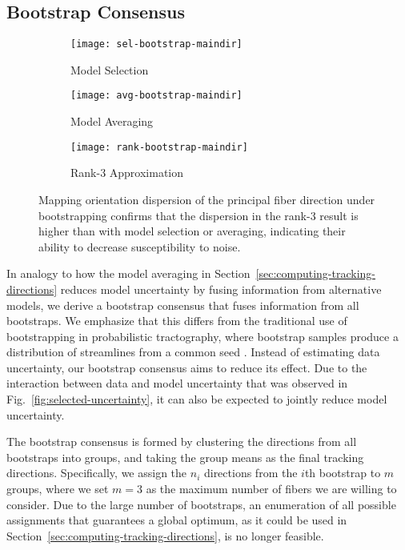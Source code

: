 \subsection{Bootstrap Consensus}
\label{sec:bootstrap-consensus}
\begin{figure*}[t]
	\centering
	\begin{subfigure}[b]{0.32\linewidth}
		\texttt{[image: sel-bootstrap-maindir]}
		\caption{Model Selection}
		
	\end{subfigure}
        \hspace{0.01\linewidth}
	\begin{subfigure}[b]{0.32\linewidth}
		\texttt{[image: avg-bootstrap-maindir]}
		\caption{Model Averaging}
	\end{subfigure}
        \hspace{0.01\linewidth}
	\begin{subfigure}[b]{0.32\linewidth}
		\texttt{[image: rank-bootstrap-maindir]}
		\caption{Rank-3 Approximation}
	\end{subfigure}

	\caption{Mapping orientation dispersion of the principal fiber
		direction under bootstrapping confirms that the dispersion in the rank-$3$
result is higher than with model selection or averaging, indicating their ability to decrease susceptibility to noise.}
	\label{fig:dispersion}
\end{figure*}

In analogy to how the model averaging in Section~\ref{sec:computing-tracking-directions} reduces model uncertainty by fusing information from alternative models, we derive a bootstrap consensus that fuses information from all bootstraps. We emphasize that this differs from the traditional use of bootstrapping in probabilistic tractography, where bootstrap samples produce a distribution of streamlines from a common seed \cite{Jones:2008,Jeurissen:2011}. Instead of estimating data uncertainty, our bootstrap consensus aims to reduce its effect. Due to the interaction between data and model uncertainty that was observed in Fig.~\ref{fig:selected-uncertainty}, it can also be expected to jointly reduce model uncertainty.

The bootstrap consensus is formed by clustering the directions from all bootstraps into groups, and taking the group means as the final tracking directions. Specifically, we assign the $n_i$ directions from the $i$th bootstrap to $m$ groups, where we set $m=3$ as the maximum number of fibers we are willing to consider. Due to the large number of bootstraps, an enumeration of all possible assignments that guarantees a global optimum, as it could be used in Section~\ref{sec:computing-tracking-directions}, is no longer feasible.

